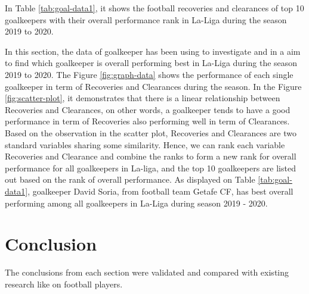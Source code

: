 \documentclass[11pt,a4paper,]{article}
\begin{document}
In Table \ref{tab:goal-data1}, it shows the football recoveries and clearances of top 10 goalkeepers with their overall performance rank in La-Liga during the season 2019 to 2020.

In this section, the data of goalkeeper has been using to investigate and in a aim to find which goalkeeper is overall performing best in La-Liga during the season 2019 to 2020. The Figure \ref{fig:graph-data} shows the performance of each single goalkeeper in term of Recoveries and Clearances during the season. In the Figure \ref{fig:scatter-plot}, it demonstrates that there is a linear relationship between Recoveries and Clearances, on other words, a goalkeeper tends to have a good performance in term of Recoveries also performing well in term of Clearances. Based on the observation in the scatter plot, Recoveries and Clearances are two standard variables sharing some similarity. Hence, we can rank each variable Recoveries and Clearance and combine the ranks to form a new rank for overall performance for all goalkeepers in La-liga, and the top 10 goalkeepers are listed out based on the rank of overall performance. As displayed on Table \ref{tab:goal-data1}, goalkeeper David Soria, from football team Getafe CF, has best overall performing among all goalkeepers in La-Liga during season 2019 - 2020.

\hypertarget{conclusion}{%
\section{Conclusion}\label{conclusion}}

The conclusions from each section were validated and compared with existing research like \textcite{brito2019new} on football players.
\end{document}
